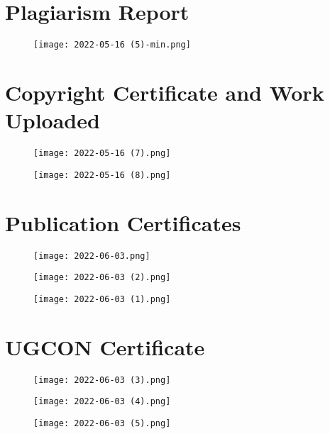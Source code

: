 \documentclass[12pt,a4paper]{report}
\begin{document}
\newpage
\section{Plagiarism Report}
\begin{figure}[htp]
    \texttt{[image: 2022-05-16 (5)-min.png]}
\end{figure}

\newpage
\section {Copyright Certificate and Work Uploaded}
\begin{figure}[htp]
    \texttt{[image: 2022-05-16 (7).png]}
\end{figure}
\begin{figure}[htp]
    \texttt{[image: 2022-05-16 (8).png]}
\end{figure}
\newpage
\section{Publication Certificates}
\begin{figure}[htp]
    \texttt{[image: 2022-06-03.png]}
\end{figure}
\begin{figure}[htp]
    \texttt{[image: 2022-06-03 (2).png]}
\end{figure}
\begin{figure}[htp]
    \texttt{[image: 2022-06-03 (1).png]}
\end{figure}
\newpage
\newpage
\section{UGCON Certificate}
\begin{figure}[htp]
    \texttt{[image: 2022-06-03 (3).png]}
\end{figure}
\begin{figure}[htp]
    \texttt{[image: 2022-06-03 (4).png]}
\end{figure}
\begin{figure}[htp]
    \texttt{[image: 2022-06-03 (5).png]}
\end{figure}
\end{document}
